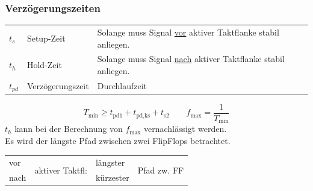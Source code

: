 \subsubsection{Verzögerungszeiten}
\begin{flushleft}
    \small
    \begin{tabular}{l l p{32mm}}
        $t_s$ & Setup-Zeit & Solange muss Signal \underline{vor} aktiver Taktflanke stabil anliegen.\\
        $t_h$ & Hold-Zeit & Solange muss Signal \underline{nach} aktiver Taktflanke stabil anliegen.\\
        $t_{pd}$ & Verzögerungszeit & Durchlaufzeit
    \end{tabular}
\end{flushleft}
\begin{equation*}
    T_{\text{min}} \geq t_{\text{pd}1} + t_{\text{pd,ks}} + t_{\text{s}2} \qquad f_{\text{max}} = \frac{1}{T_{\text{min}}}
\end{equation*}
$t_h$ kann bei der Berechnung von $f_{\text{max}}$ vernachlässigt werden.\\
Es wird der längste Pfad zwischen zwei FlipFlops betrachtet.\\
\begin{tabular}{l l l l}
    vor & \multirow{2}{*}{aktiver Taktfl:} & längster & \multirow{2}{*}{Pfad zw. FF}\\
    \cline{1-1} \cline{3-3}
    nach & & kürzester & 
\end{tabular}

